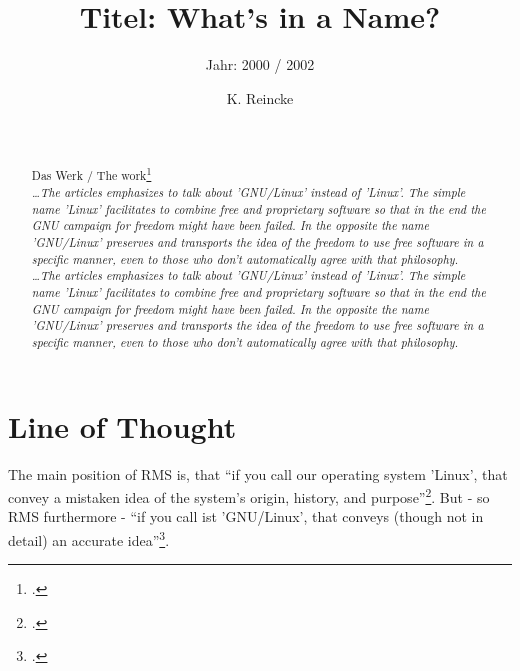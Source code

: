 \documentclass[DIV=calc,BCOR=5mm,11pt,headings=small,oneside,abstract=true, toc=bib]{scrartcl}
\begin{document}

\titlehead{Literaturexzerpt}
\subject{Autor(en): Stallman / Stallman2000a}
\title{Titel: What's in a Name?}
\subtitle{Jahr: 2000 / 2002 }
\author{K. Reincke}

\maketitle

\begin{abstract}
\noindent
\cite[(in:)][]{StaGay2002a} \\
\noindent
\cite[(ist:)][]{Stallman2000a} \\
Das Werk / The work\footcite[][]{Stallman2000a} \\
\noindent \itshape
\ldots The articles emphasizes to talk about 'GNU/Linux' instead of 'Linux'. The
simple name 'Linux' facilitates to combine free and proprietary software so that
in the end the GNU campaign for freedom might have been failed. In the opposite
the name 'GNU/Linux' preserves and transports the idea of the freedom to use
free software in a specific manner, even to those who don't automatically agree
with that philosophy.
\\
\noindent
\ldots The articles emphasizes to talk about 'GNU/Linux' instead of 'Linux'. The
simple name 'Linux' facilitates to combine free and proprietary software so that
in the end the GNU campaign for freedom might have been failed. In the opposite
the name 'GNU/Linux' preserves and transports the idea of the freedom to use
free software in a specific manner, even to those who don't automatically agree
with that philosophy.
\end{abstract}
\footnotesize
\normalsize

\section{Line of Thought}

The main position of RMS is, that \enquote{if you call our operating system
'Linux', that convey a mistaken idea of the system's origin, history, and
purpose}\footcite[cf][51]{Stallman2000a}. But - so RMS furthermore -
\enquote{if you call ist 'GNU/Linux', that conveys (though not in detail)
an accurate idea}\footcite[cf][51]{Stallman2000a}.
\end{document}

